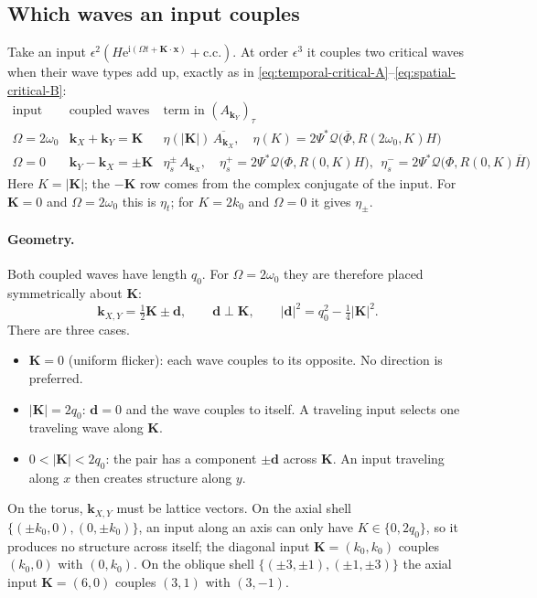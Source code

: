 \documentclass[11pt]{article}
\newcommand{\ii}{\mathrm{i}}
\newcommand{\ee}{\mathrm{e}}
\newcommand{\cQ}{\mathcal{Q}}
\newcommand{\cc}{\mathrm{c.c.}}
\begin{document}
\subsection{Which waves an input couples}
Take an input $\epsilon^2(H\ee^{\ii(\Omega t+\boldsymbol K\cdot\boldsymbol x)}+\cc)$.
At order $\epsilon^3$ it couples two critical waves when their wave types add
up, exactly as in \eqref{eq:temporal-critical-A}--\eqref{eq:spatial-critical-B}:
\begin{equation}
\begin{array}{c|c|c}
 \text{input} & \text{coupled waves} & \text{term in } (A_{\boldsymbol k_Y})_\tau\\ \hline
 \Omega=2\omega_0 & \boldsymbol k_X+\boldsymbol k_Y=\boldsymbol K &
 \eta(|\boldsymbol K|)\,\overline{A_{\boldsymbol k_X}},\quad
 \eta(K)=2\Psi^*\cQ\bigl(\overline\Phi,R(2\omega_0,K)H\bigr)\\
 \Omega=0 & \boldsymbol k_Y-\boldsymbol k_X=\pm\boldsymbol K &
 \eta_s^\pm\,A_{\boldsymbol k_X},\quad
 \eta_s^+=2\Psi^*\cQ\bigl(\Phi,R(0,K)H\bigr),\ \
 \eta_s^-=2\Psi^*\cQ\bigl(\Phi,R(0,K)\overline H\bigr)
\end{array}
\label{eq:wavevector-rule}
\end{equation}
Here $K=|\boldsymbol K|$; the $-\boldsymbol K$ row comes from the complex
conjugate of the input. For $\boldsymbol K=0$ and $\Omega=2\omega_0$ this is
$\eta_t$; for $K=2k_0$ and $\Omega=0$ it gives $\eta_\pm$.

\paragraph{Geometry.}
Both coupled waves have length $q_0$. For $\Omega=2\omega_0$ they are
therefore placed symmetrically about $\boldsymbol K$:
\begin{equation}
 \boldsymbol k_{X,Y}=\tfrac12\boldsymbol K\pm\boldsymbol d,\qquad
 \boldsymbol d\perp\boldsymbol K,\qquad
 |\boldsymbol d|^2=q_0^2-\tfrac14|\boldsymbol K|^2.
 \label{eq:pair-geometry}
\end{equation}
There are three cases.
\begin{itemize}
 \item $\boldsymbol K=0$ (uniform flicker): each wave couples to its
 opposite. No direction is preferred.
 \item $|\boldsymbol K|=2q_0$: $\boldsymbol d=0$ and the wave couples to
 itself. A traveling input selects one traveling wave along
 $\boldsymbol K$.
 \item $0<|\boldsymbol K|<2q_0$: the pair has a component $\pm\boldsymbol d$
 across $\boldsymbol K$. An input traveling along $x$ then creates
 structure along $y$.
\end{itemize}
On the torus, $\boldsymbol k_{X,Y}$ must be lattice vectors. On the axial
shell $\{(\pm k_0,0),(0,\pm k_0)\}$, an input along an axis can only have
$K\in\{0,2q_0\}$, so it produces no structure across itself; the diagonal input
$\boldsymbol K=(k_0,k_0)$ couples $(k_0,0)$ with $(0,k_0)$. On the oblique shell
$\{(\pm3,\pm1),(\pm1,\pm3)\}$ the axial input $\boldsymbol K=(6,0)$ couples
$(3,1)$ with $(3,-1)$.
\end{document}
